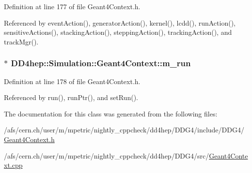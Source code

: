 Definition at line 177 of file Geant4Context.h.

Referenced by eventAction(), generatorAction(), kernel(), lcdd(), runAction(), sensitiveActions(), stackingAction(), steppingAction(), trackingAction(), and trackMgr().\hypertarget{class_d_d4hep_1_1_simulation_1_1_geant4_context_a87c4aed90cd013934b16b5307b65184c}{
\subsubsection[{m\_\-run}]{$\ast$ {\bf DD4hep::Simulation::Geant4Context::m\_\-run}}}
\label{class_d_d4hep_1_1_simulation_1_1_geant4_context_a87c4aed90cd013934b16b5307b65184c}


Definition at line 178 of file Geant4Context.h.

Referenced by run(), runPtr(), and setRun().

The documentation for this class was generated from the following files:\begin{DoxyCompactItemize}
\item 
/afs/cern.ch/user/m/mpetric/nightly\_\-cppcheck/dd4hep/DDG4/include/DDG4/\hyperlink{_geant4_context_8h}{Geant4Context.h}\item 
/afs/cern.ch/user/m/mpetric/nightly\_\-cppcheck/dd4hep/DDG4/src/\hyperlink{_geant4_context_8cpp}{Geant4Context.cpp}\end{DoxyCompactItemize}
